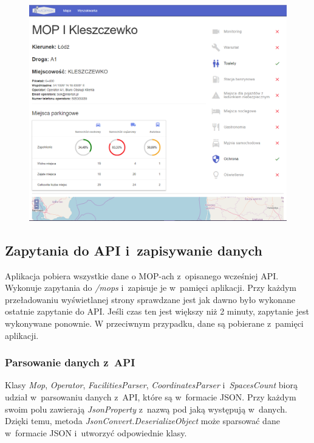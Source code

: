 \begin{figure}[!htb]
\centering
\includegraphics[width=\textwidth]{images/mopsik_www/details1.png}
\label{mopsik_www_details}
\end{figure}

\subsection{Zapytania do API i~zapisywanie danych}
Aplikacja pobiera wszystkie dane o MOP-ach z~opisanego wcześniej API. Wykonuje zapytania do \textit{/mops} i~zapisuje je w~pamięci aplikacji. Przy każdym przeładowaniu wyświetlanej strony sprawdzane jest jak dawno było wykonane ostatnie zapytanie do API. Jeśli czas ten jest większy niż 2 minuty, zapytanie jest wykonywane ponownie. W przeciwnym przypadku, dane są pobierane z~pamięci aplikacji.

\subsubsection{Parsowanie danych z~API}
Klasy \textit{Mop}, \textit{Operator}, \textit{FacilitiesParser}, \textit{CoordinatesParser} i~\textit{SpacesCount} biorą udział w~parsowaniu danych z~API, które są w~formacie JSON. Przy każdym swoim polu zawierają \textit{JsonProperty} z~nazwą pod jaką występują w~danych. Dzięki temu, metoda \textit{JsonConvert.DeserializeObject} może sparsować dane w~formacie JSON i~utworzyć odpowiednie klasy.

